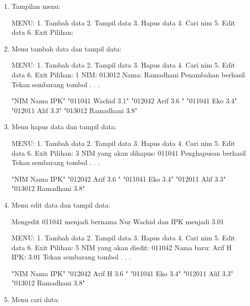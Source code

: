 \begin{enumerate}

\item
  Tampilan menu:
  
 \begin{lcverbatim}
MENU:
1. Tambah data
2. Tampil data
3. Hapus data
4. Cari nim
5. Edit data
6. Exit
Pilihan:
 \end{lcverbatim}

\item
  Menu tambah data dan tampil data:
  
 \begin{lcverbatim}
 MENU:
 1. Tambah data
 2. Tampil data
 3. Hapus data
 4. Cari nim
 5. Edit data
 6. Exit
 Pilihan: 1
 NIM: 013012
 Nama: Ramadhani
 Penambahan berhasil
 Tekan sembarang tombol . . .
 \end{lcverbatim}
  
\begin{lcverbatim}
"NIM  Nama  IPK" 
"011041  Wachid  3.1" 
"012042  Arif  3.6 "
"011041  Eko  3.4"
"012011  Alif  3.3" 
"013012 Ramadhani   3.8" 
  \end{lcverbatim}
\item
  Menu hapus data dan tampil data:
  
 \begin{lcverbatim}
MENU:
1. Tambah data
2. Tampil data
3. Hapus data
4. Cari nim
5. Edit data
6. Exit
Pilihan: 3
NIM yang akan dihapus: 011041
Penghapusan berhasil
Tekan sembarang tombol . . .
\end{lcverbatim}
\begin{lcverbatim}
"NIM  Nama  IPK" 
"012042  Arif  3.6 "
"011041  Eko  3.4"
"012011  Alif  3.3" 
"013012 Ramadhani   3.8" 
\end{lcverbatim}
   
\item
  Menu edit data dan tampil data: 
  
  Mengedit 011041 menjadi bernama
  Nur Wachid dan IPK menjadi 3.01
  
  \begin{lcverbatim}
  MENU:
  1. Tambah data
  2. Tampil data
  3. Hapus data
  4. Cari nim
  5. Edit data
  6. Exit
  Pilihan: 5
  NIM yang akan diedit: 011042
  Nama baru: Arif H
  IPK: 3.01
  Tekan sembarang tombol . . .
  \end{lcverbatim}
  
\begin{lcverbatim}
"NIM  Nama  IPK" 
"012042  Arif H  3.6 "
"011041  Eko  3.4"
"012011  Alif  3.3" 
"013012 Ramadhani   3.8" 
\end{lcverbatim}
\item
  Menu cari data:


\end{enumerate}
